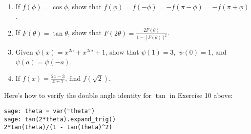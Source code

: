 \begin{enumerate}
\item
If $f \left( \phi  \right) = \cos\phi$, show that
$ f \left( \phi  \right) = f \left(  - \phi  \right) = - f \left( \pi- \phi \right) = - f \left( \pi + \phi \right)$.

\item
 If $F \left( \theta \right) = \tan\theta$, show that
$F \left( 2\theta \right) = \frac{2F \left( \theta \right)}{1 - [ F \left( \theta \right) ]^2}$. 

\item
 Given $\psi \left( x \right) = x^{2n} + x^{2m} + 1$, show that
$ \psi \left( 1 \right) = 3$,\ $\psi \left( 0 \right) = 1$, and $\psi \left( a \right) = \psi(-a)$. 

\item
If $f \left( x \right) = \frac{2x - 3}{x + 7}$, find $f \left( \sqrt{2} \right)$.

\end{enumerate}

Here's how to verify the double angle identity for $\tan$ in
Exercise 10 above:

\begin{Verbatim}[fontsize=\scriptsize,fontfamily=courier,fontshape=tt,frame=single,label=\SAGE]
sage: theta = var("theta")
sage: tan(2*theta).expand_trig()
2*tan(theta)/(1 - tan(theta)^2)
\end{Verbatim}
